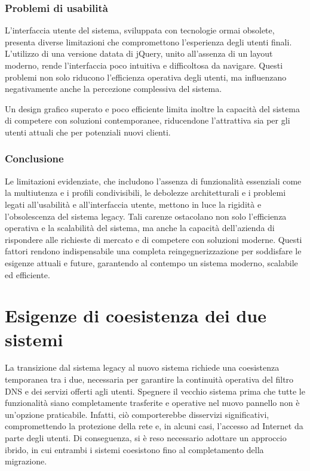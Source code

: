 \subsubsection{Problemi di usabilità}
L'interfaccia utente del sistema, sviluppata con tecnologie ormai obsolete, presenta diverse limitazioni che compromettono l’esperienza degli utenti finali. L’utilizzo di una versione datata di jQuery, unito all’assenza di un layout moderno, rende l’interfaccia poco intuitiva e difficoltosa da navigare. Questi problemi non solo riducono l’efficienza operativa degli utenti, ma influenzano negativamente anche la percezione complessiva del sistema.

Un design grafico superato e poco efficiente limita inoltre la capacità del sistema di competere con soluzioni contemporanee, riducendone l’attrattiva sia per gli utenti attuali che per potenziali nuovi clienti.

\subsubsection{Conclusione}
Le limitazioni evidenziate, che includono l’assenza di funzionalità essenziali come la multiutenza e i profili condivisibili, le debolezze architetturali e i problemi legati all’usabilità e all’interfaccia utente, mettono in luce la rigidità e l'obsolescenza del sistema legacy. Tali carenze ostacolano non solo l'efficienza operativa e la scalabilità del sistema, ma anche la capacità dell'azienda di rispondere alle richieste di mercato e di competere con soluzioni moderne. Questi fattori rendono indispensabile una completa reingegnerizzazione per soddisfare le esigenze attuali e future, garantendo al contempo un sistema moderno, scalabile ed efficiente.

\section{Esigenze di coesistenza dei due sistemi}
La transizione dal sistema legacy al nuovo sistema richiede una coesistenza temporanea tra i due, necessaria per garantire la continuità operativa del filtro DNS e dei servizi offerti agli utenti. Spegnere il vecchio sistema prima che tutte le funzionalità siano completamente trasferite e operative nel nuovo pannello non è un’opzione praticabile. Infatti, ciò comporterebbe disservizi significativi, compromettendo la protezione della rete e, in alcuni casi, l'accesso ad Internet da parte degli utenti. Di conseguenza, si è reso necessario adottare un approccio ibrido, in cui entrambi i sistemi coesistono fino al completamento della migrazione.

